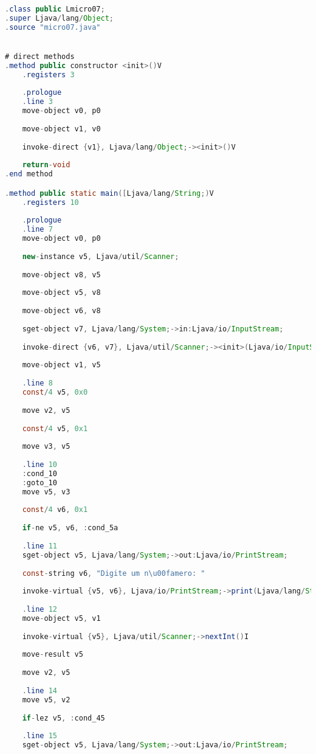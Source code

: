 \documentclass[hidelinks,12pt]{article}
\begin{document}
	\begin{lstlisting}[caption=Smali resultante do .java,language=java]
.class public Lmicro07;
.super Ljava/lang/Object;
.source "micro07.java"


# direct methods
.method public constructor <init>()V
	.registers 3
	
	.prologue
	.line 3
	move-object v0, p0
	
	move-object v1, v0
	
	invoke-direct {v1}, Ljava/lang/Object;-><init>()V
	
	return-void
.end method

.method public static main([Ljava/lang/String;)V
	.registers 10
	
	.prologue
	.line 7
	move-object v0, p0
	
	new-instance v5, Ljava/util/Scanner;
	
	move-object v8, v5
	
	move-object v5, v8
	
	move-object v6, v8
	
	sget-object v7, Ljava/lang/System;->in:Ljava/io/InputStream;
	
	invoke-direct {v6, v7}, Ljava/util/Scanner;-><init>(Ljava/io/InputStream;)V
	
	move-object v1, v5
	
	.line 8
	const/4 v5, 0x0
	
	move v2, v5
	
	const/4 v5, 0x1
	
	move v3, v5
	
	.line 10
	:cond_10
	:goto_10
	move v5, v3
	
	const/4 v6, 0x1
	
	if-ne v5, v6, :cond_5a
	
	.line 11
	sget-object v5, Ljava/lang/System;->out:Ljava/io/PrintStream;
	
	const-string v6, "Digite um n\u00famero: "
	
	invoke-virtual {v5, v6}, Ljava/io/PrintStream;->print(Ljava/lang/String;)V
	
	.line 12
	move-object v5, v1
	
	invoke-virtual {v5}, Ljava/util/Scanner;->nextInt()I
	
	move-result v5
	
	move v2, v5
	
	.line 14
	move v5, v2
	
	if-lez v5, :cond_45
	
	.line 15
	sget-object v5, Ljava/lang/System;->out:Ljava/io/PrintStream;
	

\end{lstlisting}
\end{document}
